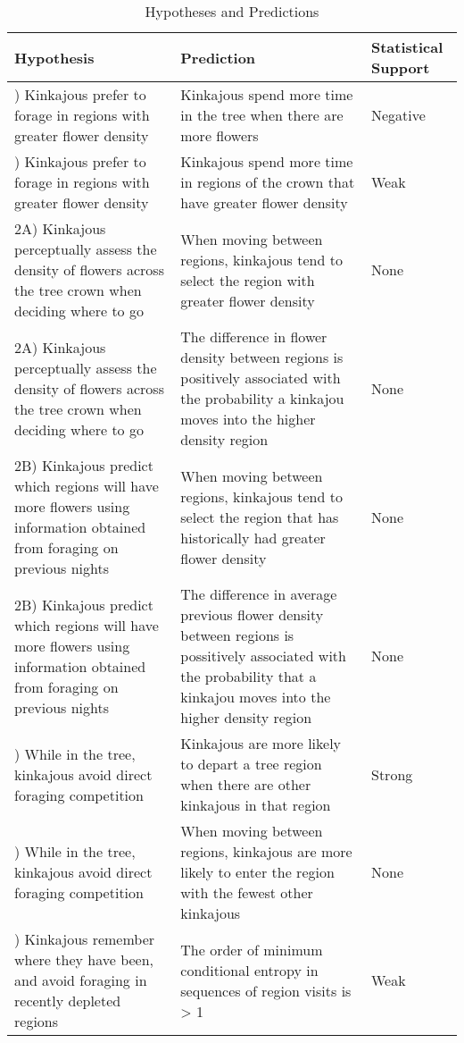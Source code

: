 \documentclass[twoside,12pt,final]{ucthesis-CA2012}
\begin{document}
\begin{ucmainmatter}
\begin{table}
\caption{\label{tab:Hypothesis-Table}Hypotheses and Predictions}
\centering
\begin{tabular}[t]{>{\raggedright\arraybackslash}p{7cm}|>{\raggedright\arraybackslash}p{7cm}|>{\raggedright\arraybackslash}p{1.5cm}}
\hline
Hypothesis & Prediction & Statistical Support\\
\hline
1) Kinkajous prefer to forage in regions with greater flower density & Kinkajous spend more time in the tree when there are more flowers & Negative\\
\hline
1) Kinkajous prefer to forage in regions with greater flower density & Kinkajous spend more time in regions of the crown that have greater flower density & Weak\\
\hline
2A) Kinkajous perceptually assess the density of flowers across the tree crown when deciding where to go & When moving between regions, kinkajous tend to select the region with greater flower density & None\\
\hline
2A) Kinkajous perceptually assess the density of flowers across the tree crown when deciding where to go & The difference in flower density between regions is positively associated with the probability a kinkajou moves into the higher density region & None\\
\hline
2B) Kinkajous predict which regions will have more flowers using information obtained from foraging on previous nights & When moving between regions, kinkajous tend to select the region that has historically had greater flower density & None\\
\hline
2B) Kinkajous predict which regions will have more flowers using information obtained from foraging on previous nights & The difference in average previous flower density between regions is possitively associated with the probability that a kinkajou moves into the higher density region & None\\
\hline
3) While in the tree, kinkajous avoid direct foraging competition & Kinkajous are more likely to depart a tree region when there are other kinkajous in that region & Strong\\
\hline
3) While in the tree, kinkajous avoid direct foraging competition & When moving between regions, kinkajous are more likely to enter the region with the fewest other kinkajous & None\\
\hline
4) Kinkajous remember where they have been, and avoid foraging in recently depleted regions & The order of minimum conditional entropy in sequences of region visits is > 1 & Weak\\
\hline
\end{tabular}
\end{table}
\hypertarget{methods-1}{%
}
\end{ucmainmatter}
\end{document}
